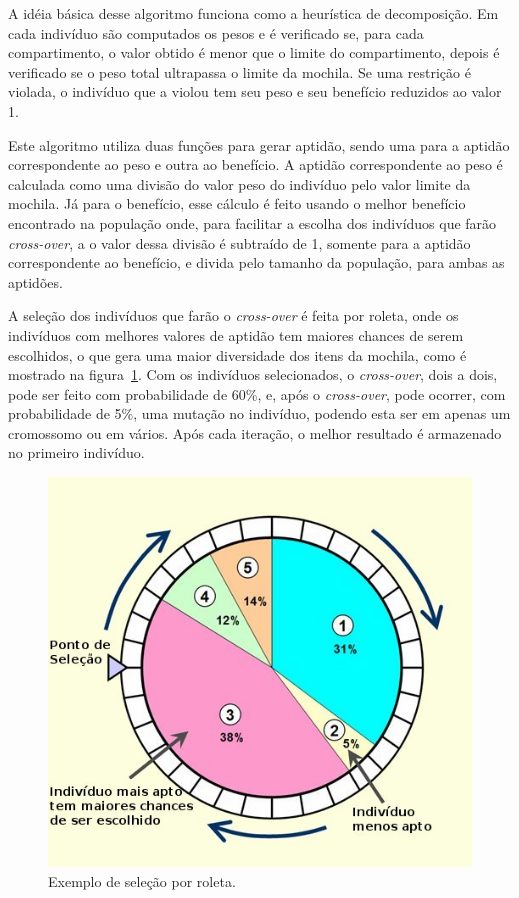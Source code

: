 A idéia básica desse algoritmo funciona como a heurística de decomposição. Em cada indivíduo são computados os pesos e é verificado se, para cada compartimento, o valor obtido é menor que o limite do compartimento, depois é verificado se o peso total ultrapassa o limite da mochila. Se uma restrição é violada, o indivíduo que a violou tem seu peso e seu benefício reduzidos ao valor 1.

Este algoritmo utiliza duas funções para gerar aptidão, sendo uma para a aptidão correspondente ao peso e outra ao benefício. A aptidão correspondente ao peso é calculada como uma divisão do valor peso do indivíduo pelo valor limite da mochila. Já para o benefício, esse cálculo é feito usando o melhor benefício encontrado na população onde, para facilitar a escolha dos indivíduos que farão \textit{cross-over}, a o valor dessa divisão é subtraído de 1, somente para a aptidão correspondente ao benefício, e divida pelo tamanho da população, para ambas as aptidões.

A seleção dos indivíduos que farão o \textit{cross-over} é feita por roleta, onde os indivíduos com melhores valores de aptidão tem maiores chances de serem escolhidos, o que gera uma maior diversidade dos itens da mochila, como é mostrado na figura~\ref{fig:roleta}. Com os indivíduos selecionados, o \textit{cross-over}, dois a dois, pode ser feito com probabilidade de 60\%, e, após o \textit{cross-over}, pode ocorrer, com probabilidade de 5\%, uma mutação no indivíduo, podendo esta ser em apenas um cromossomo ou em vários. Após cada iteração, o melhor resultado é armazenado no primeiro indivíduo.

\begin{figure}[htb]
	\centering
	\includegraphics[scale=0.5]{images/roleta.jpg}
	\caption{Exemplo de seleção por roleta.}
	\label{fig:roleta}
\end{figure}


